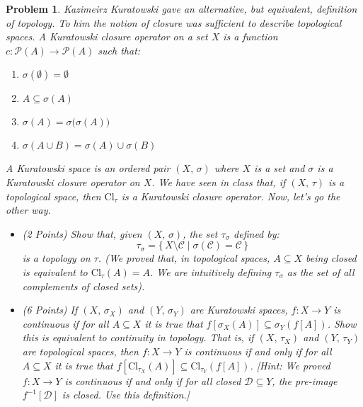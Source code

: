 \documentclass{article}
\theoremstyle{normal}
\newtheorem{problem}{Problem}
\begin{document}
    \begin{problem}
        Kazimeirz Kuratowski gave an alternative, but equivalent, definition
        of topology. To him the notion of \textit{closure} was sufficient to
        describe topological spaces. A Kuratowski closure operator on a set
        $X$ is a function $c:\mathcal{P}(A)\rightarrow\mathcal{P}(A)$ such that:
        \begin{enumerate}
            \item $\sigma(\emptyset)=\emptyset$
            \item $A\subseteq{\sigma}(A)$
            \item $\sigma(A)=\sigma\big(\sigma(A)\big)$
            \item $\sigma(A\cup{B})=\sigma(A)\cup\sigma(B)$
        \end{enumerate}
        A Kuratowski space is an ordered pair $(X,\,\sigma)$ where $X$ is a set
        and $\sigma$ is a Kuratowski closure operator on $X$. We have seen in
        class that, if $(X,\,\tau)$ is a topological space, then
        $\textrm{Cl}_{\tau}$ is a Kuratowski closure operator. Now, let's go
        the other way.
        \begin{itemize}
            \item (2 Points) Show that, given $(X,\,\sigma)$, the set
                $\tau_{\sigma}$ defined by:
                \begin{equation}
                    \tau_{\sigma}=\{\,X\setminus\mathcal{C}\;|\;
                        \sigma(\mathcal{C})=\mathcal{C}\,\}
                \end{equation}
                is a topology on $\tau$. (We proved that, in topological spaces,
                $A\subseteq{X}$ being closed is equivalent to
                $\textrm{Cl}_{\tau}(A)=A$. We are
                intuitively defining $\tau_{\sigma}$ as the set of all
                \textit{complements of closed sets}).
            \item (6 Points) If $(X,\,\sigma_{X})$ and $(Y,\,\sigma_{Y})$ are
                Kuratowski spaces, $f:X\rightarrow{Y}$ is continuous if for all
                $A\subseteq{X}$ it is true that
                $f[\sigma_{X}(A)]\subseteq\sigma_{Y}(f[A])$. Show this is
                equivalent to continuity in topology. That is, if
                $(X,\,\tau_{X})$ and $(Y,\,\tau_{Y})$ are topological spaces,
                then $f:X\rightarrow{Y}$ is continuous if and only if
                for all $A\subseteq{X}$ it is true that
                $f[\textrm{Cl}_{\tau_{X}}(A)]\subseteq\textrm{Cl}_{\tau_{Y}}(f[A])$.
                [Hint: We proved $f:X\rightarrow{Y}$ is continuous if and only
                if for all closed $\mathcal{D}\subseteq{Y}$, the pre-image
                $f^{-1}[\mathcal{D}]$ is closed. Use this definition.]
        \end{itemize}
    \end{problem}
\end{document}

